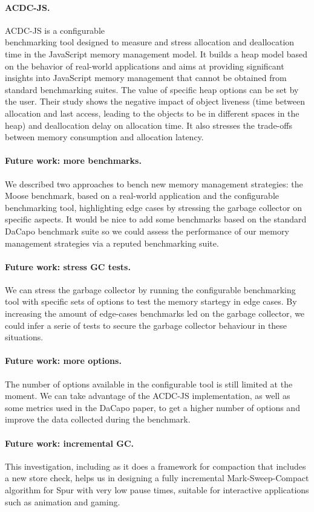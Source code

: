 \documentclass[10pt, sigplan]{acmart}
\begin{document}
\paragraph{ACDC-JS.}
ACDC-JS \cite{ACDCJS} is a configurable \\benchmarking tool designed to measure and stress allocation and deallocation time in the JavaScript memory management model. 
It builds a heap model based on the behavior of real-world applications and aims at providing significant insights into JavaScript memory management that cannot be obtained from standard benchmarking suites. The value of specific heap options can be set by the user. 
Their study shows the negative impact of object liveness (time between allocation and last access, leading to the objects to be in different spaces in the heap) and deallocation delay on allocation time. It also stresses the trade-offs between memory consumption and allocation latency.

\paragraph{Future work: more benchmarks.}
We described two approaches to bench new memory management strategies: the Moose benchmark, based on a real-world application and the configurable benchmarking tool, highlighting edge cases by stressing the garbage collector on specific aspects. It would be nice to add some benchmarks based on the standard DaCapo benchmark suite so we could assess the performance of our memory management strategies via a reputed benchmarking suite.

\paragraph{Future work: stress GC tests.}
We can stress the garbage collector by running the configurable benchmarking tool with specific sets of options to test the memory startegy in edge cases. By increasing the amount of edge-cases benchmarks led on the garbage collector, we could infer a serie of tests to secure the garbage collector behaviour in these situations.

\paragraph{Future work: more options.}
The number of options available in the configurable tool is still limited at the moment. We can take advantage of the ACDC-JS implementation, as well as some metrics used in the DaCapo paper, to get a higher number of options and improve the data collected during the benchmark.

\paragraph{Future work: incremental GC.}
This investigation, including as it does a framework for compaction that includes a new store check, helps us in designing a fully incremental Mark-Sweep-Compact algorithm for Spur with very low pause times, suitable for interactive applications such as animation and gaming.
\newpage


\end{document}
